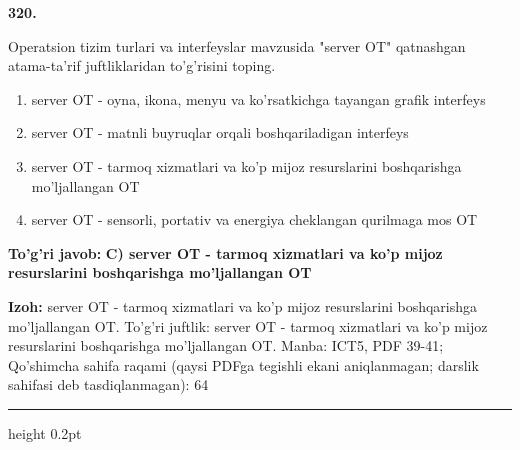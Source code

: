 \documentclass[10pt,a4paper]{article}
\begin{document}
{\bfseries\sffamily\color{ink} 320.}
\par
Operatsion tizim turlari va interfeyslar mavzusida "server OT" qatnashgan atama-ta'rif juftliklaridan to'g'risini toping.
\begin{enumerate}[label=\Alph*),leftmargin=9mm]
\item server OT - oyna, ikona, menyu va ko'rsatkichga tayangan grafik interfeys
\item server OT - matnli buyruqlar orqali boshqariladigan interfeys
\item server OT - tarmoq xizmatlari va ko'p mijoz resurslarini boshqarishga mo'ljallangan OT
\item server OT - sensorli, portativ va energiya cheklangan qurilmaga mos OT
\end{enumerate}
\begin{tcolorbox}[enhanced,breakable,colback=teal!4,colframe=teal!60!black,boxrule=0.45pt,arc=1.2mm,left=2.7mm,right=2.7mm,top=1.8mm,bottom=1.8mm,before skip=2mm,after skip=2mm]
{\bfseries\sffamily\color{teal}To'g'ri javob:} \textbf{C) server OT - tarmoq xizmatlari va ko'p mijoz resurslarini boshqarishga mo'ljallangan OT}
\par\smallskip
{\bfseries Izoh:} server OT - tarmoq xizmatlari va ko'p mijoz resurslarini boshqarishga mo'ljallangan OT. To'g'ri juftlik: server OT - tarmoq xizmatlari va ko'p mijoz resurslarini boshqarishga mo'ljallangan OT. Manba: ICT5, PDF 39-41; Qo'shimcha sahifa raqami (qaysi PDFga tegishli ekani aniqlanmagan; darslik sahifasi deb tasdiqlanmagan): 64
\end{tcolorbox}
\vspace{2mm}\hrule height 0.2pt\vspace{3mm}
\end{document}
